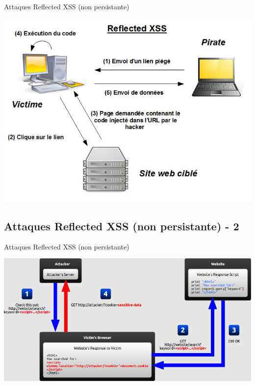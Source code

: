 \documentclass[8pt]{beamer}
\begin{document}
\begin{frame}{Attaques Reflected XSS (non persistante)}

\begin{center}
	\includegraphics[scale=.42]{../images/xss/reflected_xss.jpg}
\end{center}

\end{frame}


\subsection{Attaques Reflected XSS (non persistante) - 2}

\begin{frame}{Attaques Reflected XSS (non persistante)}

\begin{center}
	\includegraphics[scale=.42]{../images/xss/reflected_xss2.png}
\end{center}

\end{frame}
\end{document}
